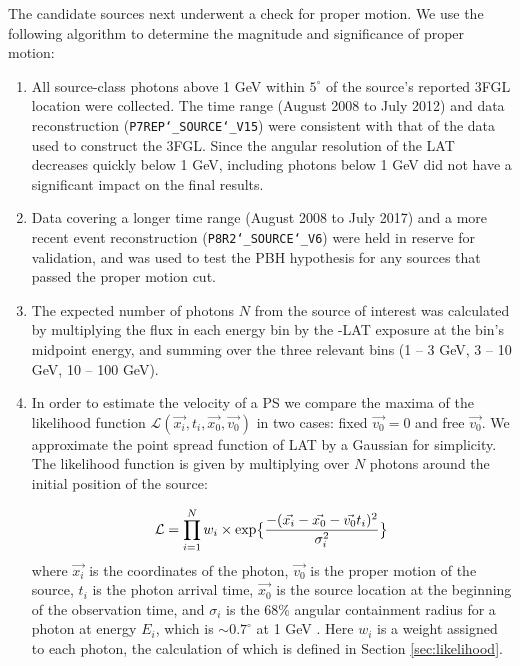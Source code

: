 The candidate sources next underwent a check for proper motion. 
We use the following algorithm to determine the magnitude and significance of proper motion:
\begin{enumerate}
\item
All source-class photons above 1 GeV within $5^\circ$ of the source's reported 3FGL location were collected.
The time range (August 2008 to July 2012) and data reconstruction (\texttt{P7REP\char`_SOURCE\char`_V15}) were consistent with that of the data used to construct the 3FGL.
Since the angular resolution of the \Fermi LAT decreases quickly below 1 GeV, including photons below 1 GeV did not have a significant impact on the final results.
\item 
Data covering a longer time range (August 2008 to July 2017) and a more recent event reconstruction (\texttt{P8R2\char`_SOURCE\char`_V6}) were held in reserve for validation, and was used to test the PBH hypothesis for any sources that passed the proper motion cut.

\item
The expected number of photons $N$ from the source of interest was calculated by multiplying the flux in each energy bin by 
the \Fermi-LAT exposure at the bin's midpoint energy, and summing over the three relevant bins (1 -- 3 GeV, 3 -- 10 GeV, 10 -- 100 GeV). 
\item 
\label{step:prop_motion_likelihood}
In order to estimate the velocity of a PS we compare the maxima of the likelihood function $\mathcal{L}(\vec{x_i},t_i,\vec{x_0},\vec{v_0})$ in two cases: 
fixed $\vec{v_0}=0$ and free $\vec{v_0}$. 
We approximate the point spread function of \Fermi LAT by a Gaussian for simplicity.
The likelihood function is given by multiplying over $N$ photons around the initial position of the source:

\noindent
\begin{equation}
\label{eq:vlike}
\mathcal{L} = \prod_{i=1}^{N}w_i\times \textup{exp} \big\{\frac{{-(\vec{x_i}-\vec{x_0}-\vec{v_0}t_i)^2}}{{\sigma_i^2}}\big\}
\end{equation}
where $\vec{x_i}$ is the coordinates of the photon, $\vec{v_0}$ is the proper motion of the source, $t_i$ is the photon arrival time, $\vec{x_0}$ is the source location at the beginning of the observation time, and $\sigma_i$ is the 68\% angular containment radius for a photon at energy $E_i$, which is $\sim 0.7^\circ$ at 1 GeV \citep{2013arXiv1304.5456B}.
Here $w_i$ is a weight assigned to each photon, the calculation of which is defined in Section \ref{sec:likelihood}. 


\end{enumerate}

